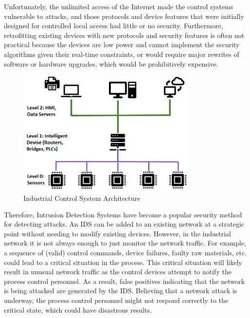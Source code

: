 \documentclass[conference]{IEEEtran}
\begin{document}
Unfortunately, the unlimited access of the Internet made the control systems vulnerable to attacks, and those protocols and device features that were initially designed for controlled local access had little or no security.  Furthermore, retrofitting existing devices with new protocols and security features is often not practical because the devices are low power and cannot implement the security algorithms given their real-time constraints, or would require major rewrites of software or hardware upgrades, which would be prohibitively expensive.

\begin{figure}[htbp]
\centering
\centerline{\includegraphics [width=9cm] {ICS-Architecture-RelOK.png}}
\caption{Industrial Control System Architecture}
\label{ICS_Arch}
\end{figure}

Therefore, Intrusion Detection Systems have become a popular security method for detecting attacks.  An IDS can be added to an existing network at a strategic point without needing to modify existing devices.
However, in the industrial network it is not always enough to just monitor the network traffic. For example, a sequence of (valid) control commands, device failures, faulty raw materials, etc. could lead to a critical situation in the process.  This critical situation will likely result in unusual network traffic as the control devices attempt to notify the process control personnel.   As a result, false positives indicating that the network is being attacked are generated by the IDS.  Believing that a network attack is underway, the process control personnel might not respond correctly to the critical state, which could have disastrous results. 
\end{document}
